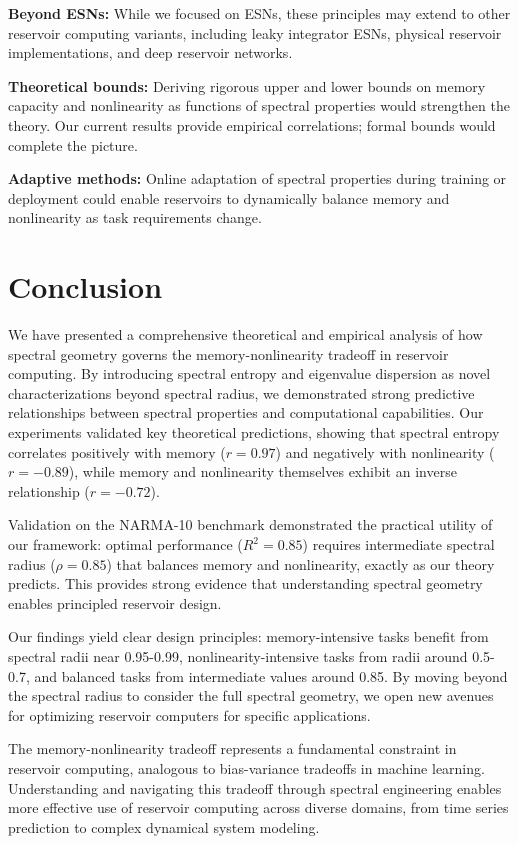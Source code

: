 \documentclass{article}
\begin{document}
\textbf{Beyond ESNs:} While we focused on ESNs, these principles may extend to other reservoir computing variants, including leaky integrator ESNs, physical reservoir implementations, and deep reservoir networks.

\textbf{Theoretical bounds:} Deriving rigorous upper and lower bounds on memory capacity and nonlinearity as functions of spectral properties would strengthen the theory. Our current results provide empirical correlations; formal bounds would complete the picture.

\textbf{Adaptive methods:} Online adaptation of spectral properties during training or deployment could enable reservoirs to dynamically balance memory and nonlinearity as task requirements change.

\section{Conclusion}
\label{sec:conclusion}

We have presented a comprehensive theoretical and empirical analysis of how spectral geometry governs the memory-nonlinearity tradeoff in reservoir computing. By introducing spectral entropy and eigenvalue dispersion as novel characterizations beyond spectral radius, we demonstrated strong predictive relationships between spectral properties and computational capabilities. Our experiments validated key theoretical predictions, showing that spectral entropy correlates positively with memory ($r=0.97$) and negatively with nonlinearity ($r=-0.89$), while memory and nonlinearity themselves exhibit an inverse relationship ($r=-0.72$).

Validation on the NARMA-10 benchmark demonstrated the practical utility of our framework: optimal performance ($R^2=0.85$) requires intermediate spectral radius ($\rho=0.85$) that balances memory and nonlinearity, exactly as our theory predicts. This provides strong evidence that understanding spectral geometry enables principled reservoir design.

Our findings yield clear design principles: memory-intensive tasks benefit from spectral radii near 0.95-0.99, nonlinearity-intensive tasks from radii around 0.5-0.7, and balanced tasks from intermediate values around 0.85. By moving beyond the spectral radius to consider the full spectral geometry, we open new avenues for optimizing reservoir computers for specific applications.

The memory-nonlinearity tradeoff represents a fundamental constraint in reservoir computing, analogous to bias-variance tradeoffs in machine learning. Understanding and navigating this tradeoff through spectral engineering enables more effective use of reservoir computing across diverse domains, from time series prediction to complex dynamical system modeling.
\end{document}
